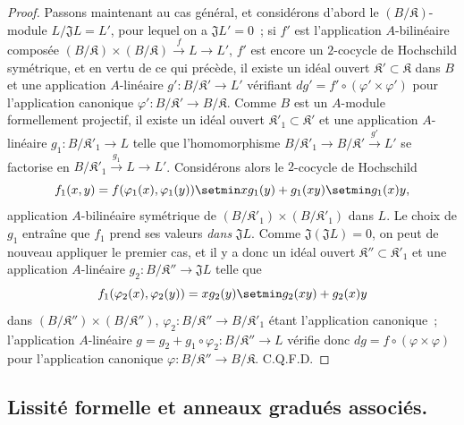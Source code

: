 \begin{proof}
Passons maintenant au cas général, et considérons d'abord le
$(B/\mathfrak K)$-module $L/\mathfrak JL=L'$, pour lequel on a
$\mathfrak JL'=0$~; si $f'$ est l'application $A$-bilinéaire composée
$(B/\mathfrak K)\times(B/\mathfrak K)\xrightarrow{f}L\to L'$, $f'$ est
encore un $2$-cocycle de Hochschild symétrique, et en vertu de ce qui précède,
il existe un idéal ouvert $\mathfrak K'\subset\mathfrak K$ dans $B$ et
une application $A$-linéaire $g':B/\mathfrak K'\to L'$ vérifiant
$dg'=f'\circ(\varphi'\times\varphi')$ pour l'application canonique
$\varphi':B/\mathfrak K'\to B/\mathfrak K$. Comme $B$ est un
$A$-module formellement projectif, il existe un idéal ouvert
$\mathfrak K'_1\subset\mathfrak K'$ et une application $A$-linéaire
$g_1:B/\mathfrak K'_1\to L$ telle que l'homomorphisme
$B/\mathfrak K'_1\to B/\mathfrak K'\xrightarrow{g'}L'$ se factorise en
$B/\mathfrak K'_1\xrightarrow{g_1}L\to L'$. Considérons alors le
$2$-cocycle de Hochschild
\[
  f_1(x,y)=f(\varphi_1(x),\varphi_1(y))\setmin xg_1(y)+g_1(xy)\setmin g_1(x)y,
\]
application $A$-bilinéaire symétrique de
$(B/\mathfrak K'_1)\times(B/\mathfrak K'_1)$ dans $L$. Le choix de
$g_1$ entraîne que $f_1$ prend ses valeurs \emph{dans} $\mathfrak JL$. Comme
$\mathfrak J(\mathfrak JL)=0$, on peut de nouveau appliquer le premier cas,
et il y a donc un idéal ouvert
$\mathfrak K''\subset\mathfrak K'_1$ et une application $A$-linéaire
$g_2:B/\mathfrak K''\to\mathfrak JL$ telle que
\[
  f_1(\varphi_2(x),\varphi_2(y))=xg_2(y)\setmin g_2(xy)+g_2(x)y
\]
dans $(B/\mathfrak K'')\times(B/\mathfrak K'')$,
$\varphi_2:B/\mathfrak K''\to B/\mathfrak K'_1$ étant l'application
canonique~; l'application $A$-linéaire
$g=g_2+g_1\circ\varphi_2:B/\mathfrak K''\to L$ vérifie donc
$dg=f\circ(\varphi\times\varphi)$ pour l'application canonique
$\varphi:B/\mathfrak K''\to B/\mathfrak K$. C.Q.F.D.
\end{proof}


\subsection{Lissité formelle et anneaux gradués associés.}
\label{subsection:0.19.5-fr}

